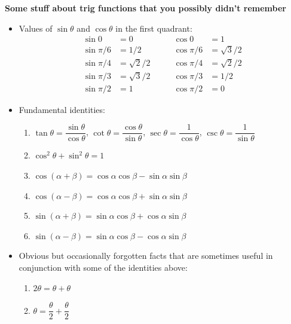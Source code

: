 \documentclass[12pt]{article}
\begin{document}
\begin{center}
 \textbf{Some stuff about trig functions that you possibly didn't remember}
\end{center}
\begin{itemize}
 \item Values of $\sin\theta$ and $\cos\theta$ in the first quadrant:
\begin{align*}
 \sin 0 &= 0  \quad& \quad \cos 0 &= 1\\
 \sin \pi/6 &= 1/2   \quad& \quad\cos \pi/6 &= \sqrt{3}/2\\
 \sin \pi/4 &= \sqrt{2}/2  \quad &\quad \cos \pi/4& = \sqrt{2}/2\\
 \sin \pi/3 &= \sqrt{3}/2   \quad &\quad\cos \pi/3& = 1/2\\
 \sin \pi/2 &= 1  \quad &\quad \cos \pi/2 &= 0
\end{align*}

\item Fundamental identities:
\begin{enumerate}
 \item $\tan\theta = \dfrac{\sin\theta}{\cos\theta}$, $\cot\theta = \dfrac{\cos\theta}{\sin\theta}$, $\sec\theta = \dfrac{1}{\cos\theta}$, $\csc\theta = \dfrac{1}{\sin\theta}$
 \item $\cos^2\theta + \sin^2\theta =1$
 \item $\cos(\alpha + \beta) = \cos\alpha\cos\beta - \sin\alpha\sin\beta$
 \item $\cos(\alpha - \beta) = \cos\alpha\cos\beta + \sin\alpha\sin\beta$
 \item $\sin(\alpha + \beta) = \sin\alpha\cos\beta + \cos\alpha\sin\beta$
 \item $\sin(\alpha - \beta) = \sin\alpha\cos\beta - \cos\alpha\sin\beta$
\end{enumerate}
\item Obvious but occasionally forgotten facts that are sometimes useful in conjunction with some of the identities above:
\begin{enumerate}
 \item $2\theta = \theta + \theta$
 \item $\theta = \dfrac{\theta}{2}+\dfrac{\theta}{2}$
\end{enumerate}


\end{itemize}
\end{document}
